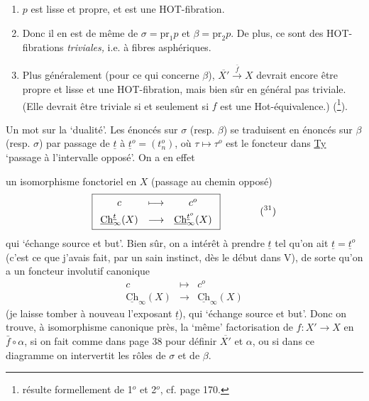 \documentclass[11pt]{article}
\newcommand{\printedpage}[1]{\marginpar{\footnotesize p.~#1}}
\newcommand{\msp}[1]{\marginpar{\footnotesize [#1]}}
\newcommand{\uCh}{\underline{\mathrm{Ch}}}
\begin{document}
\begin{enumerate}[label={}, leftmargin=*]
\item[1$^o$)] $p$ est lisse et propre, et est une HOT-fibration.

\item[2$^o$)] Donc il en est de même de $\sigma=\mathrm{pr}_1p$ et $\beta=\mathrm{pr}_2p$. De plus, ce sont des HOT-fibrations \textit{triviales,} i.e. à fibres asphériques.

\printedpage{87}

\item[3$^o$)] Plus généralement (pour ce qui concerne $\beta$), $\overline{X'}\xrightarrow{\ \bar{f}\ }X$ devrait encore être propre et lisse et une HOT-fibration, mais bien sûr en général pas triviale. (Elle devrait être triviale si et seulement si $f$ est une Hot-équivalence.) (\footnote[30]{résulte formellement de 1$^o$ et 2$^o$, cf. page 170.}).
\end{enumerate}

Un mot sur la `dualité'. Les énoncés sur $\sigma$ (resp. $\beta$) se traduisent en énoncés sur $\beta$ (resp. $\sigma$) par passage de $\underline{t}$ à $\underline{t}^o=(t^o_n)$, où $\tau\longmapsto\tau^o$ est le foncteur dans \underline{Ty} `passage à l'intervalle opposé'. On a en effet %

\msp{page 140}

un isomorphisme fonctoriel en $X$ (passage au chemin opposé)
\[
\boxed{\begin{array}{ccc}
c & \longmapsto & c^o\\[4pt]
\uCh^{\underline{t}}_\infty(X) & \longrightarrow & \uCh^{\underline{t}^o}_\infty(X)
\end{array}}
\qquad\qquad
\text{(\footnotemark[31])}
\]
qui `échange source et but'. Bien sûr, on a intérêt à prendre $\underline{t}$ tel qu'on ait $\underline{t}=\underline{t}^o$ (c'est ce que j'avais fait, par un sain instinct, dès le début dans V), de sorte qu'on a un foncteur involutif canonique
\[
\begin{array}{ccc}
c & \longmapsto & c^o\\[4pt]
\uCh_\infty(X) & \longrightarrow & \uCh_\infty(X)
\end{array}
\]
(je laisse tomber à nouveau l'exposant $\underline{t}$), qui `échange source et but'. Donc on trouve, à isomorphisme canonique près, la `même' factorisation de $f:X'\longrightarrow X$ en $\bar{f}\circ\alpha$, si on fait comme dans page 38 pour définir $\overline{X'}$ et $\alpha$, ou si dans ce diagramme on intervertit les rôles de $\sigma$ et de $\beta$. %
\end{document}
